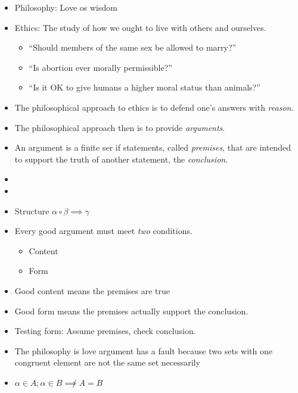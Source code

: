 \documentclass{article}
\begin{document}
\begin{spacing}{1.2}
    \newpage
    \begin{itemize}
        \item Philosophy: Love os wisdom
        \item Ethics: The study of how we ought to live with others and ourselves.
              \begin{itemize}
                  \item ``Should members of the same sex be allowed to marry?''
                  \item ``Is abortion ever morally permissible?''
                  \item ``Is it OK to give humans a higher moral status than animals?''
              \end{itemize}
        \item The philosophical approach to ethics is to defend one's answers with \emph{reason}.
        \item The philosophical approach then is to provide \emph{arguments}.
        \item An argument is a finite ser if statements, called \emph{premises}, that are intended to support the truth of another statement, the \emph{conclusion}.
        \item {}
        \item {}
        \item Structure \(\alpha \circ \beta \implies \gamma \)
        \item Every good argument must meet \emph{two} conditions.
              \begin{itemize}
                  \item Content
                  \item Form
              \end{itemize}
        \item Good content means the premises are true
        \item Good form means the premises actually support the conclusion.
        \item Testing form: Assume premises, check conclusion.
        \item The philosophy is love argument has a fault because two sets with one congruent element are not the same set necessarily
        \item \(\alpha\in A; \alpha\in B \not\implies A = B\)

\end{itemize}
\end{spacing}
\end{document}
